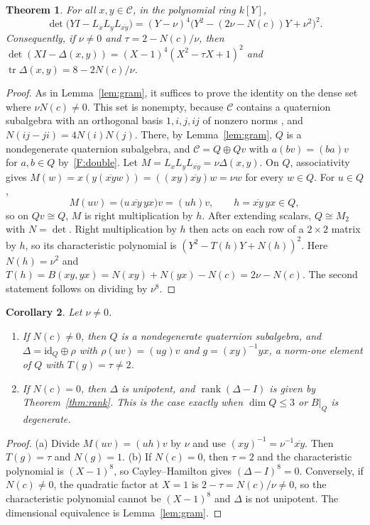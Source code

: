\documentclass[11pt]{amsart}
\newtheorem{theorem}{Theorem}[section]
\newtheorem{corollary}[theorem]{Corollary}
\theoremstyle{definition}
\theoremstyle{remark}
\newcommand{\C}{\mathcal{C}}
\newcommand{\conj}[1]{\overline{#1}}
\DeclareMathOperator{\rank}{rank}
\DeclareMathOperator{\tr}{tr}
\begin{document}
\begin{theorem}\label{thm:charpoly}
For all $x,y\in\C$, in the polynomial ring $k[Y]$,
\[
  \det\bigl(YI-L_xL_yL_{\conj{xy}}\bigr)
  =(Y-\nu)^4\bigl(Y^2-(2\nu-N(c))Y+\nu^2\bigr)^2.
\]
Consequently, if $\nu\neq0$ and $\tau=2-N(c)/\nu$, then
$\det(XI-\Delta(x,y))=(X-1)^4(X^2-\tau X+1)^2$ and
$\tr\Delta(x,y)=8-2N(c)/\nu$.
\end{theorem}

\begin{proof}
As in Lemma~\ref{lem:gram}, it suffices to prove the identity on the dense set
where $\nu N(c)\neq0$. This set is nonempty, because $\C$ contains a
quaternion subalgebra with an orthogonal basis $1,i,j,ij$ of nonzero norms
\cite[Ch.~1]{springer2000}, and $N(ij-ji)=4N(i)N(j)$. There, by
Lemma~\ref{lem:gram}, $Q$ is a nondegenerate quaternion subalgebra, and
$\C=Q\oplus Qv$ with $a(bv)=(ba)v$ for $a,b\in Q$ by~\ref{F:double}. Let
$M=L_xL_yL_{\conj{xy}}=\nu\Delta(x,y)$. On $Q$, associativity gives
$M(w)=x(y(\conj{xy}w))=((xy)\conj{xy})w=\nu w$ for every $w\in Q$.
For $u\in Q$,
\[
  M(uv)=\bigl(u\,\conj{xy}\,yx\bigr)v=(uh)v,\qquad h=\conj{xy}\,yx\in Q,
\]
so on $Qv\cong Q$, $M$ is right multiplication by $h$. After extending scalars,
$Q\cong M_2$ with $N=\det$. Right multiplication by $h$ then acts on each row
of a $2\times2$ matrix by $h$, so its characteristic polynomial is
$(Y^2-T(h)Y+N(h))^2$. Here $N(h)=\nu^2$ and
$T(h)=B(xy,yx)=N(xy)+N(yx)-N(c)=2\nu-N(c)$. The second statement follows on
dividing by $\nu^8$.
\end{proof}

\begin{corollary}\label{cor:class}
Let $\nu\neq0$.
\begin{enumerate}[label=\textup{(\alph*)}]
\item If $N(c)\neq0$, then $Q$ is a nondegenerate quaternion subalgebra, and
  $\Delta=\mathrm{id}_Q\oplus\rho$ with $\rho(uv)=(ug)v$ and
  $g=(xy)^{-1}yx$, a norm-one element of $Q$ with $T(g)=\tau\neq2$.
\item If $N(c)=0$, then $\Delta$ is unipotent, and $\rank(\Delta-I)$ is
  given by Theorem~\ref{thm:rank}. This is the case exactly when
  $\dim Q\le3$ or $B|_Q$ is degenerate.
\end{enumerate}
\end{corollary}

\begin{proof}
(a) Divide $M(uv)=(uh)v$ by $\nu$ and use $(xy)^{-1}=\nu^{-1}\conj{xy}$.
Then $T(g)=\tau$ and $N(g)=1$. (b) If $N(c)=0$, then $\tau=2$ and the
characteristic polynomial is $(X-1)^8$, so Cayley--Hamilton gives
$(\Delta-I)^8=0$. Conversely, if $N(c)\neq0$, the quadratic factor at
$X=1$ is $2-\tau=N(c)/\nu\neq0$, so the characteristic polynomial
cannot be $(X-1)^8$ and $\Delta$ is not unipotent. The dimensional
equivalence is Lemma~\ref{lem:gram}.
\end{proof}
\end{document}
